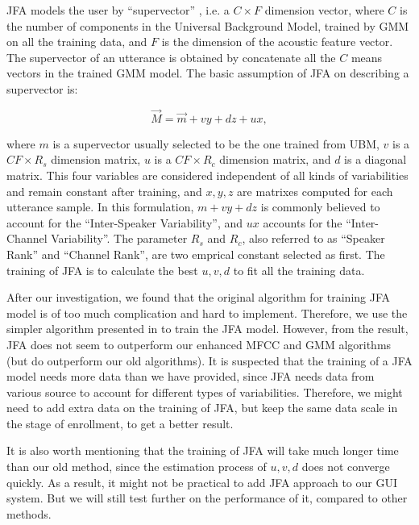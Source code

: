 JFA models the user by ``supervector'' , i.e. a $C\times F $ dimension vector, where $C$ is
the number of components in the Universal Background Model, trained by GMM on all the training data,
and $ F$ is the dimension of the acoustic feature vector. The supervector of an utterance is obtained by concatenate
all the $C $ means vectors in the trained GMM model. The basic assumption of JFA on describing a supervector is:

\[ \vec{M} = \vec{ m } + vy + dz + ux, \]

where $m$ is a supervector usually selected to be the one trained from UBM, $v$ is a $ CF \times R_s$ dimension matrix,
$ u$ is a $ CF \times R_c$ dimension matrix, and $d$ is a diagonal matrix.
This four variables are considered independent of all kinds of variabilities and remain constant after training, and
$x, y, z $ are matrixes computed for each utterance sample.
In this formulation, $ m + vy + dz$ is commonly believed to account for the ``Inter-Speaker Variability'', and $ux $ accounts
for the ``Inter-Channel Variability''.
The parameter $ R_s $ and $ R_c$, also referred to as ``Speaker Rank'' and ``Channel Rank'', are two emprical constant selected as first.
The training of JFA is to calculate the best $ u, v, d$ to fit all the training data.

After our investigation, we found that the original algorithm \cite{jfa-se} for training JFA model is of
too much complication and hard to implement.
Therefore, we use the simpler algorithm presented in \cite{jfa-study}
to train the JFA model. However, from the result, JFA does not seem to outperform our enhanced MFCC and GMM algorithms
(but do outperform our old algorithms). It is suspected that the training of a JFA model needs more data than
we have provided, since JFA needs data from various source to account for different types of variabilities.
Therefore, we might need to add extra data on the training of JFA, but keep the same data scale in the stage of enrollment,
to get a better result.

It is also worth mentioning that the training of JFA will take much longer time than our old method,
since the estimation process of $ u, v, d$ does not converge quickly. As a result, it might not be practical to add
JFA approach to our GUI system. But we will still test further on the performance of it, compared to other methods.
